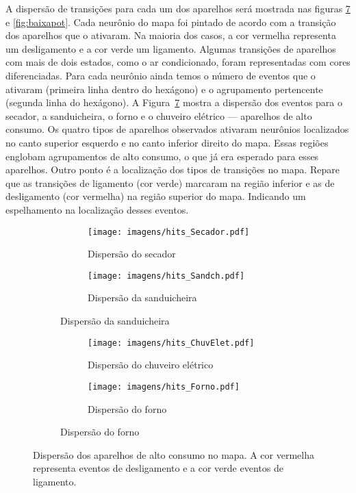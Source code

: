A dispersão de transições para cada um dos aparelhos será mostrada nas
figuras \ref{fig:hits_altapot} e \ref{fig:baixapot}. Cada neurônio do
mapa foi pintado de acordo com a transição dos aparelhos que o
ativaram. Na maioria dos casos, a cor vermelha representa um
desligamento e a cor verde um ligamento.  Algumas transições de
aparelhos com mais de dois estados, como o ar condicionado, foram
representadas com cores diferenciadas.  Para cada neurônio ainda temos
o número de eventos que o ativaram (primeira linha dentro do hexágono)
e o agrupamento pertencente (segunda linha do hexágono). A
Figura~\ref{fig:hits_altapot} mostra a dispersão dos eventos para o
secador, a sanduicheira, o forno e o chuveiro elétrico --- aparelhos
de alto consumo. Os quatro tipos de aparelhos observados ativaram
neurônios localizados no canto superior esquerdo e no canto inferior
direito do mapa. Essas regiões englobam agrupamentos de alto consumo,
o que já era esperado para esses aparelhos. Outro ponto é a
localização dos tipos de transições no mapa. Repare que as transições
de ligamento (cor verde) marcaram na região inferior e as de
desligamento (cor vermelha) na região superior do mapa. Indicando um
espelhamento na localização desses eventos. 
	
\begin{figure}[!htb]
  \begin{center}

    \begin{subfigure}[c]{\textwidth}
      \begin{subfigure}[c]{8cm}
        \texttt{[image: imagens/hits\_Secador.pdf]}
        \caption{Dispersão do secador}
        \label{fig:hits_secador}
      \end{subfigure}
      \begin{subfigure}[c]{8cm}
        \texttt{[image: imagens/hits\_Sandch.pdf]}
        \caption{Dispersão da sanduicheira}
        \label{fig:hits_sanduicheira}
      \end{subfigure}
    \end{subfigure}

    \begin{subfigure}[c]{\textwidth}
      \begin{subfigure}[c]{8cm}
        \texttt{[image: imagens/hits\_ChuvElet.pdf]}
        \caption{Dispersão do chuveiro elétrico}
        \label{fig:hits_chuveiro}
      \end{subfigure}
      \begin{subfigure}[c]{8cm}
        \texttt{[image: imagens/hits\_Forno.pdf]}
        \caption{Dispersão do forno}
        \label{fig:hits_forno}
      \end{subfigure}
    \end{subfigure}

  \end{center}
\caption{Dispersão dos aparelhos de alto consumo no mapa. A cor
vermelha representa eventos de desligamento e a cor verde eventos de
ligamento.}
\label{fig:hits_altapot}
\end{figure}

